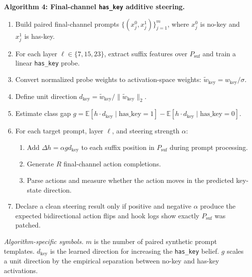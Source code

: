 \documentclass[11pt]{article}
\begin{document}
\medskip
\noindent\textbf{Algorithm 4: Final-channel \texttt{has\_key} additive steering.}
\begin{enumerate}[leftmargin=*,itemsep=1pt,topsep=2pt]
  \item Build paired final-channel prompts $\{(x_j^0,x_j^1)\}_{j=1}^{m}$, where $x_j^0$ is no-key and $x_j^1$ is has-key.
  \item For each layer $\ell\in\{7,15,23\}$, extract suffix features over $P_{\mathrm{suf}}$ and train a linear \texttt{has\_key} probe.
  \item Convert normalized probe weights to activation-space weights: $\tilde{w}_{\mathrm{key}}=w_{\mathrm{key}}/\sigma$.
  \item Define unit direction $d_{\mathrm{key}}=\tilde{w}_{\mathrm{key}}/\|\tilde{w}_{\mathrm{key}}\|_2$.
  \item Estimate class gap $g=\mathbb{E}[h\cdot d_{\mathrm{key}}\mid \mathrm{has\_key}=1]-\mathbb{E}[h\cdot d_{\mathrm{key}}\mid \mathrm{has\_key}=0]$.
  \item For each target prompt, layer $\ell$, and steering strength $\alpha$:
    \begin{enumerate}[leftmargin=1.5em,itemsep=1pt,topsep=1pt]
      \item Add $\Delta h=\alpha g d_{\mathrm{key}}$ to each suffix position in $P_{\mathrm{suf}}$ during prompt processing.
      \item Generate $R$ final-channel action completions.
      \item Parse actions and measure whether the action moves in the predicted key-state direction.
    \end{enumerate}
  \item Declare a clean steering result only if positive and negative $\alpha$ produce the expected bidirectional action flips and hook logs show exactly $P_{\mathrm{suf}}$ was patched.
\end{enumerate}
\noindent\emph{Algorithm-specific symbols.}
$m$ is the number of paired synthetic prompt templates.
$d_{\mathrm{key}}$ is the learned direction for increasing the \texttt{has\_key} belief.
$g$ scales a unit direction by the empirical separation between no-key and has-key activations.
\end{document}
